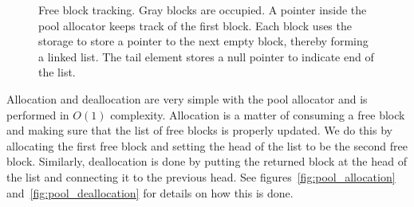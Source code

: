 \documentclass{article}
\begin{document}
\begin{figure}[b]
    \centering
    \caption{Free block tracking. Gray blocks are occupied. A pointer inside the pool allocator keeps track of the first block. Each block uses the storage to store a pointer to the next empty block, thereby forming a linked list. The tail element stores a null pointer to indicate end of the list.}
    \label{fig:pool_free_blocks}
\end{figure}

Allocation and deallocation are very simple with the pool allocator and is performed in $O(1)$ complexity. Allocation is a matter of consuming a free block and making sure that the list of free blocks is properly updated. We do this by allocating the first free block and setting the head of the list to be the second free block. Similarly, deallocation is done by putting the returned block at the head of the list and connecting it to the previous head. See figures~\ref{fig:pool_allocation} and~\ref{fig:pool_deallocation} for details on how this is done.
\end{document}
